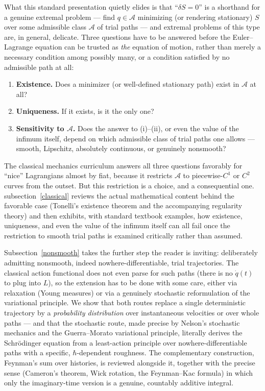 What this standard presentation quietly elides is that ``$\delta S=0$'' is a
shorthand for a genuine extremal problem --- find $q\in\mathcal{A}$ minimizing
(or rendering stationary) $S$ over some admissible class $\mathcal{A}$ of trial
paths --- and extremal problems of this type are, in general, delicate. Three
questions have to be answered before the Euler--Lagrange equation can be
trusted as \emph{the} equation of motion, rather than merely a necessary
condition among possibly many, or a condition satisfied by no admissible path
at all:
\begin{enumerate}
\item \textbf{Existence.} Does a minimizer (or well-defined stationary path)
    exist in $\mathcal{A}$ at all?
\item \textbf{Uniqueness.} If it exists, is it the only one?
\item \textbf{Sensitivity to $\mathcal{A}$.} Does the answer to (i)--(ii), or
    even the value of the infimum itself, depend on which admissible class of
        trial paths one allows --- smooth, Lipschitz, absolutely continuous, or
        genuinely nonsmooth?
\end{enumerate}
The classical mechanics curriculum answers all three questions favorably for
``nice'' Lagrangians almost by fiat, because it restricts $\mathcal{A}$ to
piecewise-$C^1$ or $C^2$ curves from the outset. But this restriction is a
choice, and a consequential one. subsection~\ref{classical} reviews the actual
mathematical content behind the favorable case (Tonelli's existence theorem and
the accompanying regularity theory) and then exhibits, with standard textbook
examples, how existence, uniqueness, and even the value of the infimum itself
can all fail once the restriction to smooth trial paths is examined critically
rather than assumed.

Subsection~\ref{nonsmooth} takes the further step the reader is inviting:
deliberately admitting nonsmooth, indeed nowhere-differentiable, trial
trajectories. The classical action functional does not even parse for such
paths (there is no $\dot q(t)$ to plug into $L$), so the extension has to be
done with some care, either via relaxation (Young measures) or via a genuinely
stochastic reformulation of the variational principle. We show that both routes
replace a single deterministic trajectory by a \emph{probability distribution}
over instantaneous velocities or over whole paths --- and that the stochastic
route, made precise by Nelson's stochastic mechanics and the Guerra--Morato
variational principle, literally derives the Schr\"odinger equation from a
least-action principle over nowhere-differentiable paths with a specific,
$\hbar$-dependent roughness. The complementary construction, Feynman's sum over
histories, is reviewed alongside it, together with the precise sense (Cameron's
theorem, Wick rotation, the Feynman--Kac formula) in which only the
imaginary-time version is a genuine, countably additive integral.

